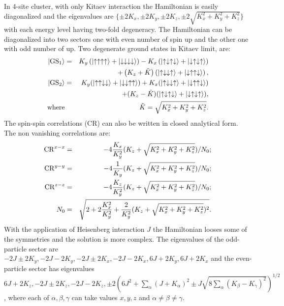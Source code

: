 \documentclass[aps,amsmath,twocolumn,amssymb,floatfix,showpacs,superscriptaddress,nofootinbib,longbibliography]{revtex4-1}
\begin{document}
In 4-site cluster, with only Kitaev interaction the Hamiltonian is easily diagonalized and the eigenvalues are $ \{\pm 2K_x, \pm 2K_y, \pm 2K_z, \pm 2\sqrt{K_x^2+K_y^2+K_z^2}\}$ with each energy level having two-fold degeneracy. The Hamiltonian can be diagonalized into two sectors one with even number of spin up and the other one with odd number of up. Two degenerate ground states in Kitaev limit, are:
\begin{eqnarray}
	\ket{{\rm GS}_1}&=&K_y\left( \ket{\uparrow\uparrow\uparrow\uparrow}+\ket{\downarrow\downarrow\downarrow\downarrow}\right)-K_x\left(\ket{\uparrow\downarrow\uparrow\downarrow}+\ket{\downarrow\uparrow\downarrow\uparrow}\right)\nonumber\\
	&&+\left( K_z+\tilde{K}\right) \left( \ket{\uparrow\downarrow\downarrow\uparrow}+\ket{\downarrow\uparrow\uparrow\downarrow} \right), \nonumber\\
	\ket{{\rm GS}_2}&=&K_y(\ket{\uparrow\uparrow\downarrow\downarrow}+\ket{\downarrow\downarrow\uparrow\uparrow})+K_x(\ket{\uparrow\downarrow\downarrow\uparrow}+\ket{\downarrow\uparrow\uparrow\downarrow})\nonumber\\
	&&+(K_z-\tilde{K})(\ket{\uparrow\downarrow\uparrow\downarrow}+\ket{\downarrow\uparrow\downarrow\uparrow}),\nonumber\\
	{\rm where}&&\tilde{K}=\sqrt{K_x^2+K_y^2+K_z^2}.
\end{eqnarray}
The spin-spin correlations (CR) can also be written in closed analytical form. The non vanishing correlations are:
\begin{eqnarray}
	{\rm CR}^{x-x}&=&-4\frac{K_x}{K_y^2}(K_z+\sqrt{K_x^2+K_y^2+K_z^2})/N_0;\nonumber\\
	{\rm CR}^{y-y}&=&-4\frac{1}{K_y}(K_z+\sqrt{K_x^2+K_y^2+K_z^2})/N_0;\nonumber\\
	{\rm CR}^{z-z}&=&-4\frac{K_z}{K_y^2}(K_z+\sqrt{K_x^2+K_y^2+K_z^2})/N_0;\nonumber\\
	N_0&=&\sqrt{ 2+2\frac{K_x^2}{K_y^2}+\frac{2}{K_y^2}(K_z+\sqrt{K_x^2+K_y^2+K_z^2})^2}.\nonumber\\
\end{eqnarray}
 With the application of Heisenberg interaction $J$ the Hamiltonian looses some of the symmetries and the solution is more complex. The eigenvalues of the odd-particle sector are $-2J\pm2K_y,-2J-2K_y,-2J\pm2K_x,-2J-2K_x,6J+2K_y,6J+2K_x$ and the even-particle sector has eigenvalues $6J+2K_z,-2J\pm 2K_z,-2J-2K_z,\pm2\left(6J^2+\sum_{\alpha}^{}(J+K_\alpha)^2\pm J\sqrt{8\sum_{\alpha}^{}(K_\beta-K_\gamma)^2}\right)^{1/2}$, where each of $\alpha,\beta,\gamma$ can take values $x,y,z$ and $\alpha\neq\beta\neq\gamma$.\\
\end{document}
